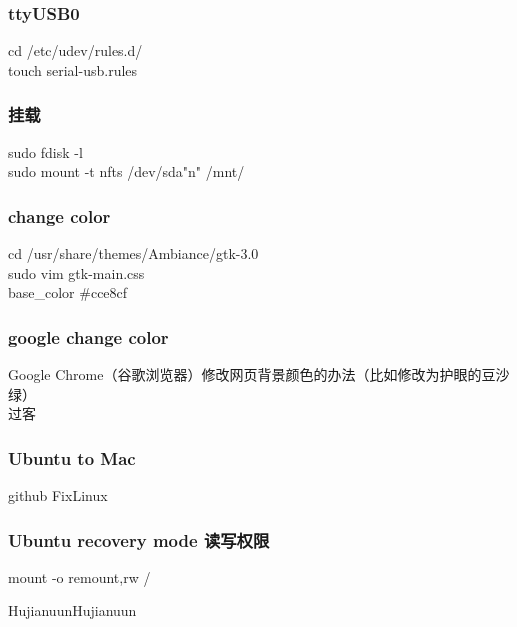 \documentclass{beamer}
\newcommand{\quotes}[1]{"#1"}
\begin{document}
\begin{CJK}{UTF8}{gkai}
    \begin{frame}\frametitle{ttyUSB0}
        cd /etc/udev/rules.d/ \\
        touch serial-usb.rules\\
    \end{frame}

    \begin{frame}\frametitle{挂载}
        sudo fdisk -l\\
        sudo mount -t nfts /dev/sda\quotes{n} /mnt/
    \end{frame}

    \begin{frame}\frametitle{change color}
        cd /usr/share/themes/Ambiance/gtk-3.0\\ %
        sudo vim gtk-main.css\\
        base\_color \#cce8cf\\
    \end{frame}

    \begin{frame}\frametitle{google change color}
        Google Chrome（谷歌浏览器）修改网页背景颜色的办法（比如修改为护眼的豆沙绿）  \\
        过客\\
    \end{frame}



    \begin{frame}\frametitle{Ubuntu to Mac}
        github FixLinux 
    \end{frame}

    \begin{frame}\frametitle{Ubuntu recovery mode 读写权限}
        mount -o remount,rw /
    \end{frame}

    \begin{frame}
        HujianuunHujianuun
    \end{frame}

\end{CJK}
\end{document}

